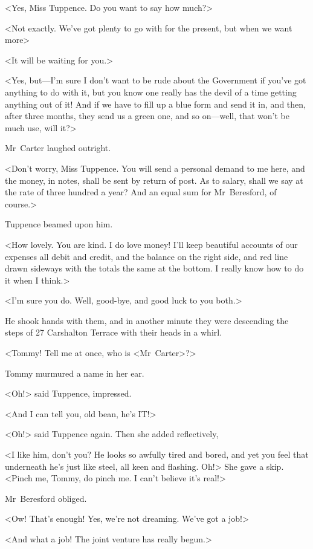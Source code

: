 <Yes, Miss Tuppence. Do you want to say how much?>

<Not exactly. We've got plenty to go with for the present, but when we want more\longdash>

<It will be waiting for you.>

<Yes, but—I'm sure I don't want to be rude about the Government if you've got anything to do with it, but you know one really has the devil of a time getting anything out of it! And if we have to fill up a blue form and send it in, and then, after three months, they send us a green one, and so on—well, that won't be much use, will it?>

Mr~Carter laughed outright.

<Don't worry, Miss Tuppence. You will send a personal demand to me here, and the money, in notes, shall be sent by return of post. As to salary, shall we say at the rate of three hundred a year? And an equal sum for Mr~Beresford, of course.>

Tuppence beamed upon him.

<How lovely. You are kind. I do love money! I'll keep beautiful accounts of our expenses all debit and credit, and the balance on the right side, and red line drawn sideways with the totals the same at the bottom. I really know how to do it when I think.>

<I'm sure you do. Well, good-bye, and good luck to you both.>

He shook hands with them, and in another minute they were descending the steps of 27 Carshalton Terrace with their heads in a whirl.

<Tommy! Tell me at once, who is <Mr~Carter>?>

Tommy murmured a name in her ear.

<Oh!> said Tuppence, impressed.

<And I can tell you, old bean, he's IT!>

<Oh!> said Tuppence again. Then she added reflectively,

<I like him, don't you? He looks so awfully tired and bored, and yet you feel that underneath he's just like steel, all keen and flashing. Oh!> She gave a skip. <Pinch me, Tommy, do pinch me. I can't believe it's real!>

Mr~Beresford obliged.

<Ow! That's enough! Yes, we're not dreaming. We've got a job!>

<And what a job! The joint venture has really begun.>

